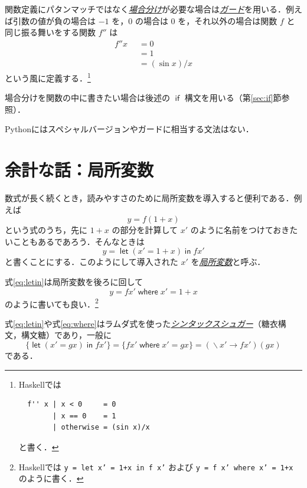 \documentclass[a4paper]{jsbook}
\newcommand{\programminglanguage}[1]{\textsf{#1}}
\newcommand{\haskell}{\programminglanguage{Haskell}}
\newcommand{\python}{\programminglanguage{Python}}
\newcommand{\keyword}[1]{{\underline{\emph{#1}}}}
\newcommand{\code}[1]{\texttt{#1}}
\newcommand{\mKeyword}[1]{\mathsf{#1}}
\newcommand{\mIfKeyword}{\mKeyword{if}}
\newcommand{\mLetKeyword}{\mKeyword{let}}
\newcommand{\mInKeyword}{\mKeyword{in}}
\newcommand{\mWhereKeyword}{\mKeyword{where}}
\newcommand{\mGuard}[1]{\mathop{\mid_{#1}}}
\DeclareMathOperator{\mLambda}{\backslash}
\DeclareMathOperator{\mLambdaArrow}{\rightarrow}
\DeclareMathOperator{\mIf}{\mIfKeyword}
\DeclareMathOperator{\mWhere}{\mWhereKeyword}
\DeclareMathOperator{\mLet}{\mLetKeyword} %
\DeclareMathOperator{\mInKW}{\mInKeyword} %
\newcommand{\mLetIn}[2]{\mLet{#1}\mInKW{#2}}
\newcommand{\mLambdaExp}[2]{\mLambda{#1}\mLambdaArrow{#2}}
\newcommand{\mathKeyword}[1]{\operatorname{\textsf{#1}}}
\newcommand{\mathOtherwise}{\mathKeyword{otherwise}}
\begin{document}
関数定義にパタンマッチではなく\keyword{場合分け}が必要な場合は\keyword{ガード}を用いる．例えば引数の値が負の場合は $-1$ を，$0$ の場合は $0$ を，それ以外の場合は関数 $f$ と同じ振る舞いをする関数 $f''$ は
\begin{equation}
\begin{split}
f''x&\mGuard{x<0}=0\\
&\mGuard{x\equiv 0}=1\\
&\mGuard{\mathOtherwise}=(\sin x)/x
\end{split}
\end{equation}
という風に定義する．\footnote{\haskell では
\begin{verbatim}
  f'' x | x < 0     = 0
        | x == 0    = 1
        | otherwise = (sin x)/x
\end{verbatim}
と書く．}

場合分けを関数の中に書きたい場合は後述の $\mIf$ 構文を用いる（第\ref{sec:if}節参照）．

\python にはスペシャルバージョンやガードに相当する文法はない．

\section{余計な話：局所変数}

数式が長く続くとき，読みやすさのために局所変数を導入すると便利である．例えば
\begin{equation}
y=f(1+x)
\end{equation}
という式のうち，先に $1+x$ の部分を計算して $x'$ のように名前をつけておきたいこともあるであろう．そんなときは
\begin{equation}
\label{eq:letin}
y=\mLetIn{(x'=1+x)}{fx'}
\end{equation}
と書くことにする．このようにして導入された $x'$ を\keyword{局所変数}と呼ぶ．

式\eqref{eq:letin}は局所変数を後ろに回して
\begin{equation}
\label{eq:where}
y=fx'\mWhere x'=1+x
\end{equation}
のように書いても良い．\footnote{\haskell では \code{y = let x' = 1+x in f x'} および \code{y = f x' where x' = 1+x} のように書く．}

式\eqref{eq:letin}や式\eqref{eq:where}はラムダ式を使った\keyword{シンタックスシュガー}（糖衣構文，構文糖）であり，一般に
\begin{equation}
\{\mLetIn{(x'=gx)}{fx'}\}
=\{fx'\mWhere x'=gx\}
=(\mLambdaExp{x'}{fx'})(gx)
\end{equation}
である．
\end{document}

